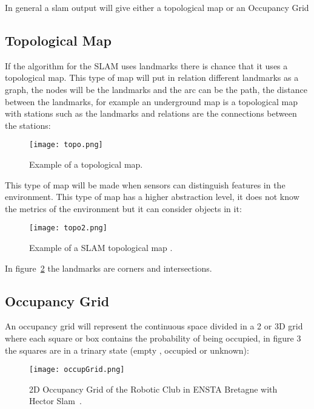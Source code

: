 In general a slam output will give either a topological map or an Occupancy Grid\\

\subsection{Topological Map}

If the algorithm for the SLAM uses landmarks there is chance that it uses a topological map. This type of map will put in relation different landmarks as a graph, the nodes will be the landmarks and the arc can be the path, the distance between the landmarks, for example an underground map is a topological map with stations such as the landmarks and relations are the connections between the stations:\\

\begin{figure}[H]
\centering
    \texttt{[image: topo.png]} 
    \caption{Example of a topological map.}
    \label{fig:topoExample}
\end{figure}

This type of map will be made when sensors can distinguish features in the environment. This type of map has a higher abstraction level, it does not know the metrics of the environment but it can consider objects in it:

\begin{figure}[H]
\centering
    \texttt{[image: topo2.png]} 
    \caption{Example of a SLAM topological map \cite{Ranganathan10ijrr}.}
    \label{fig:topo2Example}
\end{figure}

 In figure~\ref{fig:topo2Example} the landmarks are corners and intersections. 

\subsection{Occupancy Grid}

An occupancy grid will represent the continuous space divided in a 2 or 3D grid where each square or box contains the probability of being occupied, in figure 3 the squares are in a trinary state (empty , occupied or unknown):


\begin{figure}[H]
\centering
    \texttt{[image: occupGrid.png]} 
    \caption{2D Occupancy Grid of the Robotic Club in ENSTA Bretagne with Hector Slam~\cite{kohlbrecher2011flexible}.}
    \label{fig:occupGrid}
\end{figure}
